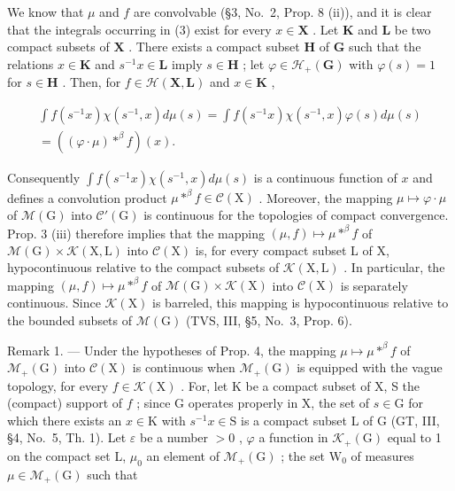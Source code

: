 We know that \(\mu\) and \(f\) are convolvable (§3, No.~2, Prop. 8 (ii)), and it is clear that the integrals occurring in (3) exist for every \(x \in \mathbf{X}\) . Let \(\mathbf{K}\) and \(\mathbf{L}\) be two compact subsets of \(\mathbf{X}\) . There exists a compact subset \(\mathbf{H}\) of \(\mathbf{G}\) such that the relations \(x \in \mathbf{K}\) and \(s^{-1}x \in \mathbf{L}\) imply \(s \in \mathbf{H}\) ; let \(\varphi \in \mathcal{H}_{+}(\mathbf{G})\) with \(\varphi(s) = 1\) for \(s \in \mathbf{H}\) . Then, for \(f \in \mathcal{H}(\mathbf{X}, \mathbf{L})\) and \(x \in \mathbf{K}\) ,

\[
\begin{array}{c} \int f (s ^ {- 1} x) \chi (s ^ {- 1}, x) d \mu (s) = \int f (s ^ {- 1} x) \chi (s ^ {- 1}, x) \varphi (s) d \mu (s) \\ = ((\varphi \cdot \mu) * ^ {\beta} f) (x). \end{array}
\]

Consequently \(\int f(s^{-1}x)\chi(s^{-1},x)d\mu(s)\) is a continuous function of \(x\) and defines a convolution product \(\mu * ^ {\beta} f\in \mathcal{C}(\mathrm{X})\) . Moreover, the mapping \(\mu \mapsto \varphi \cdot \mu\) of \(\mathcal{M}(\mathrm{G})\) into \(\mathcal{C}'(\mathrm{G})\) is continuous for the topologies of compact convergence. Prop. 3 (iii) therefore implies that the mapping \((\mu ,f)\mapsto \mu * ^ {\beta} f\) of \(\mathcal{M}(\mathrm{G})\times \mathcal{K}(\mathrm{X},\mathrm{L})\) into \(\mathcal{C}(\mathrm{X})\) is, for every compact subset L of X, hypocontinuous relative to the compact subsets of \(\mathcal{K}(\mathrm{X},\mathrm{L})\) . In particular, the mapping \((\mu ,f)\mapsto \mu * ^ {\beta} f\) of \(\mathcal{M}(\mathrm{G})\times \mathcal{K}(\mathrm{X})\) into \(\mathcal{C}(\mathrm{X})\) is separately continuous. Since \(\mathcal{K}(\mathrm{X})\) is barreled, this mapping is hypocontinuous relative to the bounded subsets of \(\mathcal{M}(\mathrm{G})\) (TVS, III, §5, No.~3, Prop. 6).

Remark 1. --- Under the hypotheses of Prop. 4, the mapping \(\mu \mapsto \mu *^{\beta}f\) of \(\mathcal{M}_{+}(\mathrm{G})\) into \(\mathcal{C}(\mathrm{X})\) is continuous when \(\mathcal{M}_{+}(\mathrm{G})\) is equipped with the vague topology, for every \(f\in \mathcal{K}(\mathrm{X})\) . For, let K be a compact subset of X, S the (compact) support of \(f\) ; since G operates properly in X, the set of \(s\in \mathrm{G}\) for which there exists an \(x\in \mathrm{K}\) with \(s^{-1}x\in \mathrm{S}\) is a compact subset L of G (GT, III, §4, No.~5, Th. 1). Let \(\varepsilon\) be a number \(>0\) , \(\varphi\) a function in \(\mathcal{K}_{+}(\mathrm{G})\) equal to 1 on the compact set L, \(\mu_0\) an element of \(\mathcal{M}_{+}(\mathrm{G})\) ; the set \(\mathrm{W}_0\) of measures \(\mu \in \mathcal{M}_{+}(\mathrm{G})\) such that

